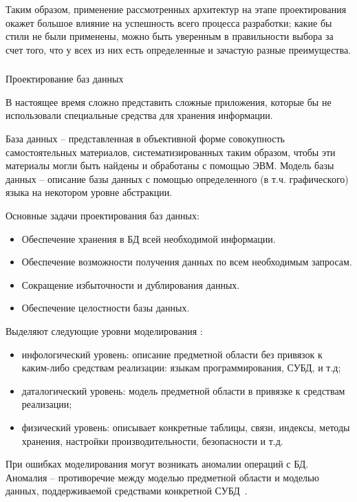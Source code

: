 Таким образом, применение рассмотренных архитектур на этапе проектирования окажет большое влияние на успешность всего процесса разработки; какие бы стили не были применены, можно быть уверенным в правильности выбора за счет того, что у всех из них есть определенные и зачастую разные преимущества.

\subsubsection{} Проектирование баз данных
\label{sec:analysis:literature:db}

В настоящее время сложно представить сложные приложения, которые бы не использовали специальные средства для хранения информации.

База данных -- представленная в объективной форме совокупность самостоятельных материалов, систематизированных таким образом, чтобы эти материалы могли быть найдены и обработаны с помощью ЭВМ. Модель базы данных -- описание базы данных с помощью  определенного (в т.ч. графического) языка на некотором уровне абстракции.

Основные задачи проектирования баз данных:
\begin{itemize}
	\item Обеспечение хранения в БД всей необходимой информации.
	\item Обеспечение возможности получения данных по всем необходимым запросам.
	\item Сокращение избыточности и дублирования данных.
	\item Обеспечение целостности базы данных.
\end{itemize}

Выделяют следующие уровни моделирования \cite{kulikov_db_workbook}:
\begin{itemize}
	\item инфологический уровень: описание предметной области без привязок к каким-либо средствам реализации: языкам программирования, СУБД, и т.д;
	\item даталогический уровень: модель предметной области в привязке к сре\-д\-с\-т\-вам реализации;
	\item физический уровень: описывает конкретные таблицы, связи, индексы, методы хранения, настройки производительности, безопасности и т.д.
\end{itemize}

При ошибках моделирования могут возникать аномалии операций с БД. Аномалия -- противоречие между моделью предметной области и моделью данных, поддерживаемой средствами конкретной СУБД~\cite{kulikov_db_workbook}.

